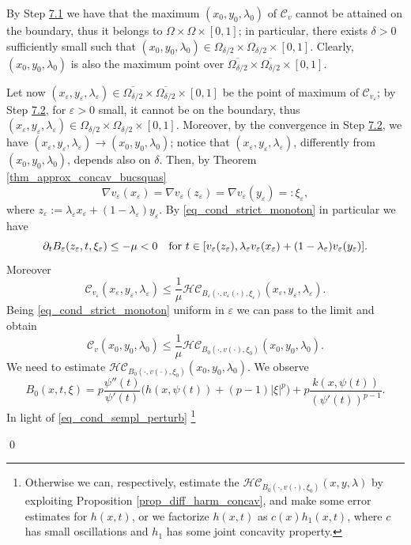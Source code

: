 \documentclass[11pt, reqno]{amsart}
\theoremstyle{definition}
\numberwithin{equation}{section}
\newcommand{\mc}[1]{\mathcal{#1}}
\def\eps{\varepsilon}
\renewenvironment{proof}[1][\proofname]{\medskip \noindent {\bfseries #1. }}{\qed \bigskip}
\begin{document}
\begin{proof} 
By Step \hyperlink{Step7.1}{\rm{7.1}} we have that the maximum $(x_0, y_0, \lambda_0)$ of $\mc{C}_v$ cannot be attained on the boundary, thus it belongs to $\Omega \times \Omega \times [0,1]$; in particular, there exists $\delta>0$ sufficiently small such that $(x_0,y_0,\lambda_0) \in \Omega_{\delta/2} \times \Omega_{\delta/2} \times [0,1]$. Clearly, $(x_0,y_0,\lambda_0)$ is also the maximum point over $ \overline{\Omega_{\delta/2}} \times \overline{\Omega_{\delta/2}} \times [0,1]$.

Let now $(x_{\eps},y_{\eps},\lambda_{\eps}) \in \overline{\Omega_{\delta/2}} \times \overline{\Omega_{\delta/2}} \times [0,1]$ be the point of maximum of $\mc{C}_{v_{\eps}}$; by Step \hyperlink{Step7.2}{\rm{7.2}}, for $\eps>0$ small, it cannot be on the boundary, thus $(x_{\eps},y_{\eps},\lambda_{\eps}) \in \Omega_{\delta/2} \times \Omega_{\delta/2} \times [0,1]$. 
Moreover, by the convergence in Step \hyperlink{Step7.2}{\rm{7.2}}, we have $(x_{\eps},y_{\eps},\lambda_{\eps}) \to (x_0,y_0,\lambda_0)$; notice that $(x_{\eps}, y_{\eps}, \lambda_{\eps})$, differently from $(x_0,y_0,\lambda_0)$, depends also on $\delta$.
Then, by Theorem \ref{thm_approx_concav_bucsquas} 
$$\nabla v_{\eps}(x_{\eps}) = \nabla v_{\eps} (z_{\eps}) = \nabla v_{\eps} (y_{\eps}) =: \xi_{\eps},$$
where $z_{\eps}:=\lambda_{\eps} x_{\eps} + (1-\lambda_{\eps}) y_{\eps}$. 
By \eqref{eq_cond_strict_monoton} in particular we have 
$$\partial_t B_{\eps}(z_{\eps},t,\xi_{\eps}) \leq - \mu <0 \quad \hbox{for $t \in [v_{\eps}(z_{\eps}), \lambda_{\eps} v_{\eps}(x_{\eps}) + (1-\lambda_{\eps})v_{\eps}(y_{\eps})]$}. $$
Moreover
$$\mc{C}_{v_{\eps}}(x_{\eps},y_{\eps},\lambda_{\eps}) \leq \frac{1}{\mu} \mc{HC}_{B_{\eps}(\cdot, v_{\eps}(\cdot), \xi_{\eps})}(x_{\eps},y_{\eps},\lambda_{\eps}). $$
Being \eqref{eq_cond_strict_monoton} uniform in $\eps$ we can pass to the limit and obtain
$$\mc{C}_{v}(x_0, y_0, \lambda_0) \leq \frac{1}{\mu} \mc{HC}_{B_0(\cdot, v(\cdot), \xi_0)}(x_0, y_0, \lambda_0).$$
We need to estimate $\mc{HC}_{B_0(\cdot, v(\cdot), \xi_0)}(x_0, y_0, \lambda_0)$. 
We observe
$$B_0(x,t,\xi)= p \frac{\psi''(t)}{\psi'(t)} \big( h(x,\psi(t)) + (p-1) |\xi|^p \big) + p \frac{k(x,\psi(t))}{(\psi'(t))^{p-1}}.$$
In light of \eqref{eq_cond_sempl_perturb}%
\footnote{Otherwise we can, respectively, estimate the $\mc{HC}_{B_0(\cdot, v(\cdot), \xi_0)}(x,y,\lambda)$ by exploiting Proposition \ref{prop_diff_harm_concav}, and make some error estimates for $h(x,t)$, or we factorize $h(x,t)$ as $c(x) h_1(x,t)$, where $c$ has small oscillations and $h_1$ has some joint concavity property.} 

\end{proof}
\end{document}
